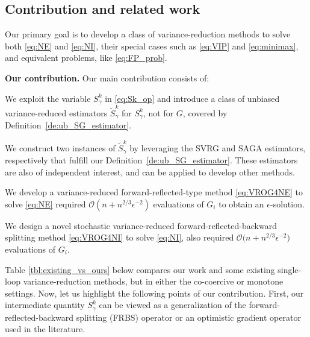 \documentclass{article}
\newcommand{\beforesubsec}{\vspace{-1.5ex}}
\newcommand{\aftersubsec}{\vspace{-1.5ex}}
\theoremstyle{plain}
\theoremstyle{definition}
\theoremstyle{remark}
\begin{document}
\beforesubsec
\subsection{Contribution and related work}\label{subsec:contribution_related_work}
\aftersubsec
Our primary goal is to develop a class of variance-reduction methods to solve both \eqref{eq:NE} and \eqref{eq:NI},  their special cases such as  \eqref{eq:VIP} and \eqref{eq:minimax}, and equivalent problems, like \eqref{eq:FP_prob}.

\textbf{Our contribution.} Our main contribution consists of:  
\begin{compactitem}
\item[(a)] We exploit the variable $S_{\gamma}^k$ in \eqref{eq:Sk_op} and introduce a class of unbiased variance-reduced estimators $\widetilde{S}^k_{\gamma}$ for $S^k_{\gamma}$, not for $G$,  covered by Definition~\ref{de:ub_SG_estimator}.

\item[(b)] We construct two instances of $\widetilde{S}^k_{\gamma}$ by leveraging the SVRG \citep{SVRG} and SAGA \citep{Defazio2014} estimators, respectively that fulfill our Definition~\ref{de:ub_SG_estimator}.
These estimators are also of independent interest, and can be applied to develop other methods.

\item[(c)] We develop a variance-reduced forward-reflected-type method \eqref{eq:VROG4NE} to solve \eqref{eq:NE} required $\mathcal{O}( n \! + \! n^{2/3}\epsilon^{-2} )$ evaluations of $G_i$ to obtain an $\epsilon$-solution.  

\item[(d)] We design a novel stochastic variance-reduced forward-reflected-backward splitting method \eqref{eq:VROG4NI} to solve \eqref{eq:NI}, also required $\mathcal{O}( n \! + \! n^{2/3}\epsilon^{-2} \big)$ evaluations of $G_i$.
\end{compactitem}
Table \ref{tbl:existing_vs_ours} below compares our work and some existing single-loop variance-reduction methods, but in either the co-coercive or monotone settings.
Now, let us highlight the following points of our contribution. 
First, our intermediate quantity $S^k_{\gamma}$ can be viewed as a generalization of the forward-reflected-backward splitting (FRBS) operator \citep{malitsky2020forward} or an optimistic gradient operator \citep{daskalakis2018training} used in the literature. 
\end{document}
